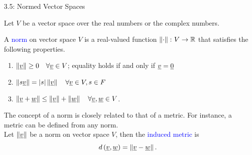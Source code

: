 \documentclass[10pt,english,aspectratio=169]{beamer}
\begin{document}
\begin{frame}{3.5: Normed Vector Spaces}

Let $V$ be a vector space over the real numbers or the complex numbers.

\begin{definition}
A \textcolor{blue}{norm} on vector space $V$ is a real-valued function $\left\| \cdot \right\| \colon V \rightarrow \mathbb{R}$ that satisfies the following properties.
\begin{enumerate}
\item $\left\| \underline{v} \right\| \geq 0 \quad \forall \underline{v} \in V$;
equality holds if and only if $\underline{v} = \underline{0}$
\item $\left\| s \underline{v} \right\| = |s| \left\| \underline{v} \right\| \quad \forall \underline{v} \in V, s \in F$
\item $\left\| \underline{v} + \underline{w} \right\| \leq
\left\| \underline{v} \right\| + \left\| \underline{w} \right\| \quad \forall \underline{v}, \underline{w} \in V$.
\end{enumerate}
\end{definition}

\vspace{3mm}

The concept of a norm is closely related to that of a metric.
For instance, a metric can be defined from any norm.\\[2mm]
Let $\left\| \underline{v} \right\|$ be a norm on vector space $V$, then the \textcolor{blue}{induced metric} is
\begin{equation*}
d \left( \underline{v}, \underline{w} \right)
= \left\| \underline{v} - \underline{w} \right\|.
\end{equation*}


\end{frame}
\end{document}
